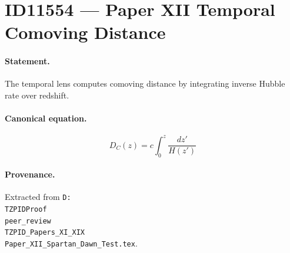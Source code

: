 \section*{ID11554 --- Paper XII Temporal Comoving Distance}

\paragraph{Statement.}
The temporal lens computes comoving distance by integrating inverse Hubble rate over redshift.

\paragraph{Canonical equation.}
\[
D_C(z)=c\int_0^z\frac{dz'}{H(z')}
\]

\paragraph{Provenance.}
Extracted from \texttt{D:\\TZPIDProof\\peer\_review\\TZPID\_Papers\_XI\_XIX\\Paper\_XII\_Spartan\_Dawn\_Test.tex}.

